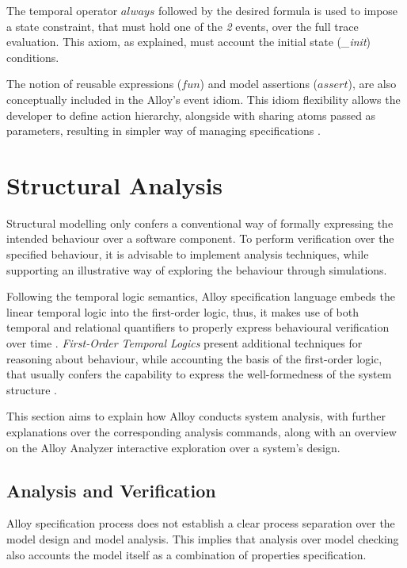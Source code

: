 The temporal operator $always$ followed by the desired formula is used to impose a state constraint, that must hold one of the \textit{2} events, over the full trace evaluation. This axiom, as explained, must account the initial state (\textit{\_init}) conditions.

The notion of reusable expressions ($fun$) and model assertions ($assert$), are also conceptually included in the Alloy's event idiom. This idiom flexibility allows the developer to define action hierarchy, alongside with sharing atoms passed as parameters, resulting in simpler way of managing specifications \cite{lwspecification, alloy-docs}.


\section{Structural Analysis}

Structural modelling only confers a conventional way of formally expressing the intended behaviour over a software component. To perform verification over the specified behaviour, it is advisable to implement analysis techniques, while supporting an illustrative way of exploring the behaviour through simulations. 

Following the temporal logic semantics, Alloy specification language embeds the linear temporal logic into the first-order logic, thus, it makes use of both temporal and relational quantifiers to properly express behavioural verification over time \cite{lwspecification}. \textit{First-Order Temporal Logics} present additional techniques for reasoning about behaviour, while accounting the basis of the first-order logic, that usually confers the capability to express the well-formedness of the system structure \cite{lwspecification, konur2010survey}.

This section aims to explain how Alloy conducts system analysis, with further explanations over the corresponding analysis commands, along with an overview on the Alloy Analyzer interactive exploration over a system's design. 

\subsection{Analysis and Verification}

Alloy specification process does not establish a clear process separation over the model design and model analysis. This implies that analysis over model checking also accounts the model itself as a combination of properties specification. 

